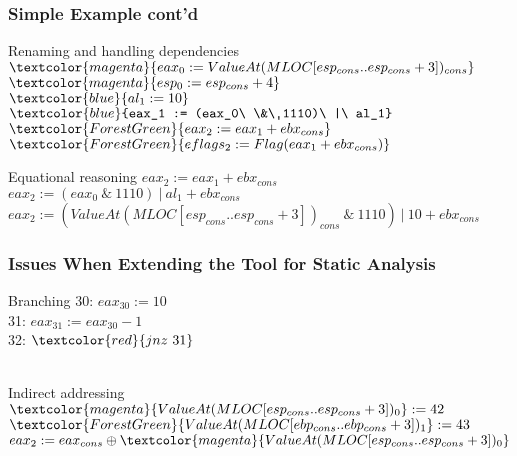 \documentclass[10pt, xcolor={dvipsnames}]{beamer}
\begin{document}
\begin{frame}
	\frametitle{Simple Example cont'd}
	\begin{block}{Renaming and handling dependencies}
		$\textcolor{magenta}{eax_0 := ValueAt(MLOC[esp_{cons}..esp_{cons}+3])_{cons}}$\\
		$\textcolor{magenta}{esp_0 := esp_{cons} + 4}$\\
		$\textcolor{blue}{al_1 := 10}$\\
		$\textcolor{blue}{eax_1 := (eax_0\ \&\ 1110)\ |\ al_1}$\\
		$\textcolor{ForestGreen}{eax_2 := eax_1 + ebx_{cons}}$\\
		$\textcolor{ForestGreen}{eflags_2 := Flag(eax_1 + ebx_{cons})}$
	\end{block}
	\vfill
	\begin{block}{Equational reasoning}
		$eax_2 := eax_1 + ebx_{cons}$\\
		$eax_2 := (eax_0\ \&\ 1110)\ |\ al_1 + ebx_{cons}$\\
		$eax_2 := (ValueAt(MLOC[esp_{cons}..esp_{cons}+3])_{cons}\ \&\ 1110)\ |\ 10 + ebx_{cons}$
	\end{block}
\end{frame}

\begin{frame}
	\frametitle{Issues When Extending the Tool for Static Analysis}
	\begin{block}{Branching}
	30: $eax_{30} := 10$\\
	31: $eax_{31} := eax_{30} - 1$\\
	32:	$\textcolor{red}{jnz\ 31}$\\\ \\
	\centering {}
	\end{block}
	\vfill
	\begin{block}{Indirect addressing}
		$\textcolor{magenta}{ValueAt(MLOC[esp_{cons}..esp_{cons}+3])_0} := 42$\\
		$\textcolor{ForestGreen}{ValueAt(MLOC[ebp_{cons}..ebp_{cons}+3])_1} := 43$\\
		$eax_2 := eax_{cons} \oplus \textcolor{magenta}{ValueAt(MLOC[esp_{cons}..esp_{cons}+3])_0}$\\\ \\
		\centering {}
	\end{block}
\end{frame}
\end{document}
